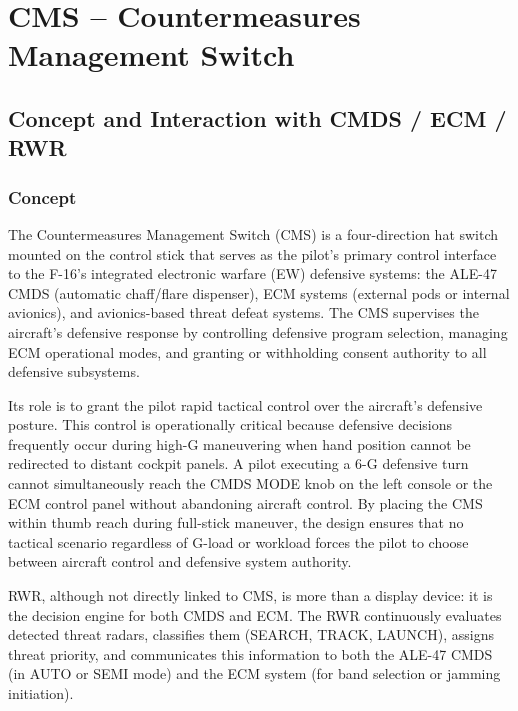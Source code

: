 \documentclass[11pt, a4paper, twoside]{report}
\begin{document}
\chapter{CMS -- Countermeasures Management Switch}
\label{chap:C5}

\section{Concept and Interaction with CMDS / ECM / RWR}\label{sec:C5-S1}

\subsection{Concept}
\label{sec:C5-S1-S1}

The Countermeasures Management Switch (CMS) is a four-direction hat switch mounted on the control stick that serves as the pilot's primary control interface to the F-16's integrated electronic warfare (EW) defensive systems: the ALE-47 CMDS (automatic chaff/flare dispenser), ECM systems (external pods or internal avionics), and avionics-based threat defeat systems. The CMS supervises the aircraft's defensive response by controlling defensive program selection, managing ECM operational modes, and granting or withholding consent authority to all defensive subsystems.

Its role is to grant the pilot rapid tactical control over the aircraft's defensive posture. This control is operationally critical because defensive decisions frequently occur during high-G maneuvering when hand position cannot be redirected to distant cockpit panels. A pilot executing a 6-G defensive turn cannot simultaneously reach the CMDS MODE knob on the left console or the ECM control panel without abandoning aircraft control. By placing the CMS within thumb reach during full-stick maneuver, the design ensures that no tactical scenario regardless of G-load or workload forces the pilot to choose between aircraft control and defensive system authority.

RWR, although not directly linked to CMS, is more than a display device: it is the decision engine for both CMDS and ECM. The RWR continuously evaluates detected threat radars, classifies them (SEARCH, TRACK, LAUNCH), assigns threat priority, and communicates this information to both the ALE-47 CMDS (in AUTO or SEMI mode) and the ECM system (for band selection or jamming initiation).
\end{document}
